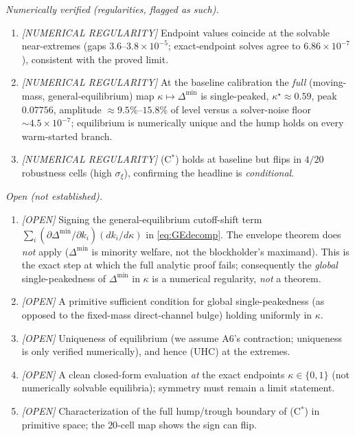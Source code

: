 \noindent\emph{Numerically verified (regularities, flagged as such).}
\begin{enumerate}
\item \emph{[NUMERICAL REGULARITY]} Endpoint values coincide at the solvable
      near-extremes (gaps $3.6$--$3.8\times10^{-5}$; exact-endpoint solves agree to
      $6.86\times10^{-7}$), consistent with the proved limit.
\item \emph{[NUMERICAL REGULARITY]} At the baseline calibration the \emph{full}
      (moving-mass, general-equilibrium) map $\kappa\mapsto\Delta^{\min}$ is
      single-peaked, $\kappa^\star\approx0.59$, peak $0.07756$, amplitude
      $\approx9.5\%$--$15.8\%$ of level versus a solver-noise floor
      $\sim4.5\times10^{-7}$; equilibrium is numerically unique and the hump holds
      on every warm-started branch.
\item \emph{[NUMERICAL REGULARITY]} (C$^\ast$) holds at baseline but flips in
      $4/20$ robustness cells (high $\sigma_\xi$), confirming the headline is
      \emph{conditional}.
\end{enumerate}

\noindent\emph{Open (not established).}
\begin{enumerate}
\item \emph{[OPEN]} Signing the general-equilibrium cutoff-shift term
      $\sum_i(\partial\Delta^{\min}/\partial k_i)(dk_i/d\kappa)$ in
      \eqref{eq:GEdecomp}. The envelope theorem does \emph{not} apply
      ($\Delta^{\min}$ is minority welfare, not the blockholder's maximand). This
      is the exact step at which the full analytic proof fails; consequently the
      \emph{global} single-peakedness of $\Delta^{\min}$ in $\kappa$ is a numerical
      regularity, \emph{not} a theorem.
\item \emph{[OPEN]} A primitive sufficient condition for global single-peakedness
      (as opposed to the fixed-mass direct-channel bulge) holding uniformly in
      $\kappa$.
\item \emph{[OPEN]} Uniqueness of equilibrium (we assume A6's contraction;
      uniqueness is only verified numerically), and hence (UHC) at the extremes.
\item \emph{[OPEN]} A clean closed-form evaluation \emph{at} the exact endpoints
      $\kappa\in\{0,1\}$ (not numerically solvable equilibria); symmetry must
      remain a limit statement.
\item \emph{[OPEN]} Characterization of the full hump/trough boundary of
      (C$^\ast$) in primitive space; the $20$-cell map shows the sign can flip.
\end{enumerate}

